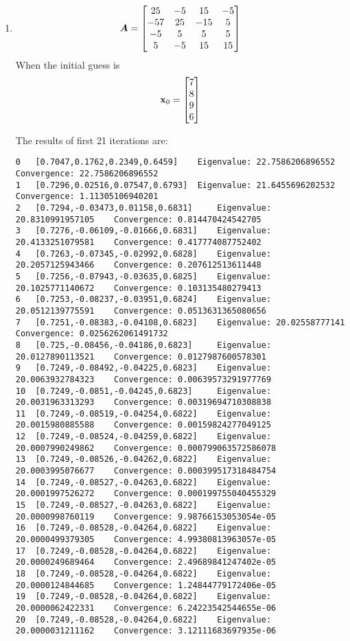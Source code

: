 \documentclass{article}
\begin{document}
\begin{enumerate}
\item 
\begin{align}
\boldsymbol{A} =\begin{bmatrix} 
25 & -5 & 15 & -5 \\  
-5 7 & 25 & -15 & 5  \\  
-5 & 5 & 5 & 5 \\  
5 & -5 & 15 & 15  \end{bmatrix}  
\end{align}
When the initial guess is 
\begin{align}
\boldsymbol{\mathrm{x}}_0=\begin{bmatrix} 7 \\ 8 \\ 9\\6 \end{bmatrix}
\end{align}

The results of first 21 iterations are: 
\begin{verbatim}
0	[0.7047,0.1762,0.2349,0.6459]	 Eigenvalue: 22.7586206896552	 Convergence: 22.7586206896552
1	[0.7296,0.02516,0.07547,0.6793]	 Eigenvalue: 21.6455696202532	 Convergence: 1.11305106940201
2	[0.7294,-0.03473,0.01158,0.6831]	 Eigenvalue: 20.8310991957105	 Convergence: 0.814470424542705
3	[0.7276,-0.06109,-0.01666,0.6831]	 Eigenvalue: 20.4133251079581	 Convergence: 0.417774087752402
4	[0.7263,-0.07345,-0.02992,0.6828]	 Eigenvalue: 20.2057125943466	 Convergence: 0.207612513611448
5	[0.7256,-0.07943,-0.03635,0.6825]	 Eigenvalue: 20.1025771140672	 Convergence: 0.103135480279413
6	[0.7253,-0.08237,-0.03951,0.6824]	 Eigenvalue: 20.0512139775591	 Convergence: 0.0513631365080656
7	[0.7251,-0.08383,-0.04108,0.6823]	 Eigenvalue: 20.02558777141	 Convergence: 0.0256262061491732
8	[0.725,-0.08456,-0.04186,0.6823]	 Eigenvalue: 20.0127890113521	 Convergence: 0.0127987600578301
9	[0.7249,-0.08492,-0.04225,0.6823]	 Eigenvalue: 20.0063932784323	 Convergence: 0.00639573291977769
10	[0.7249,-0.0851,-0.04245,0.6823]	 Eigenvalue: 20.0031963313293	 Convergence: 0.00319694710308838
11	[0.7249,-0.08519,-0.04254,0.6822]	 Eigenvalue: 20.0015980885588	 Convergence: 0.00159824277049125
12	[0.7249,-0.08524,-0.04259,0.6822]	 Eigenvalue: 20.0007990249862	 Convergence: 0.000799063572586078
13	[0.7249,-0.08526,-0.04262,0.6822]	 Eigenvalue: 20.0003995076677	 Convergence: 0.000399517318484754
14	[0.7249,-0.08527,-0.04263,0.6822]	 Eigenvalue: 20.0001997526272	 Convergence: 0.000199755040455329
15	[0.7249,-0.08527,-0.04263,0.6822]	 Eigenvalue: 20.0000998760119	 Convergence: 9.98766153053054e-05
16	[0.7249,-0.08528,-0.04264,0.6822]	 Eigenvalue: 20.0000499379305	 Convergence: 4.99380813963057e-05
17	[0.7249,-0.08528,-0.04264,0.6822]	 Eigenvalue: 20.0000249689464	 Convergence: 2.49689841247402e-05
18	[0.7249,-0.08528,-0.04264,0.6822]	 Eigenvalue: 20.0000124844685	 Convergence: 1.24844779172406e-05
19	[0.7249,-0.08528,-0.04264,0.6822]	 Eigenvalue: 20.0000062422331	 Convergence: 6.24223542544655e-06
20	[0.7249,-0.08528,-0.04264,0.6822]	 Eigenvalue: 20.0000031211162	 Convergence: 3.12111683697935e-06
\end{verbatim}
\end{enumerate}
\end{document}
